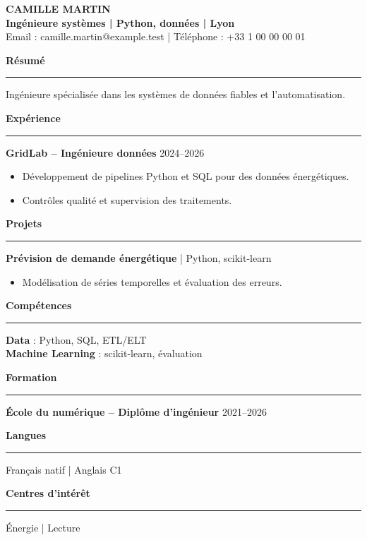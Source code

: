 \documentclass[10pt,a4paper]{article}
\newcommand{\cvsection}[1]{\par\vspace{5pt}\textbf{#1}\\[-2pt]\rule{\linewidth}{0.3pt}\vspace{3pt}}
\begin{document}
\begin{center}
{\Large \textbf{CAMILLE MARTIN}}\\[3pt]
\textbf{Ingénieure systèmes | Python, données | Lyon}\\[3pt]
Email : camille.martin@example.test | Téléphone : +33 1 00 00 00 01
\end{center}
\cvsection{Résumé}
Ingénieure spécialisée dans les systèmes de données fiables et l'automatisation.
\cvsection{Expérience}
\textbf{GridLab -- Ingénieure données} \hfill 2024--2026
\begin{itemize}[leftmargin=*]
\item Développement de pipelines Python et SQL pour des données énergétiques.
\item Contrôles qualité et supervision des traitements.
\end{itemize}
\cvsection{Projets}
\textbf{Prévision de demande énergétique} | Python, scikit-learn
\begin{itemize}[leftmargin=*]
\item Modélisation de séries temporelles et évaluation des erreurs.
\end{itemize}
\cvsection{Compétences}
\textbf{Data} : Python, SQL, ETL/ELT\\
\textbf{Machine Learning} : scikit-learn, évaluation
\cvsection{Formation}
\textbf{École du numérique -- Diplôme d'ingénieur} \hfill 2021--2026
\cvsection{Langues}
Français natif | Anglais C1
\cvsection{Centres d'intérêt}
Énergie | Lecture
\end{document}
